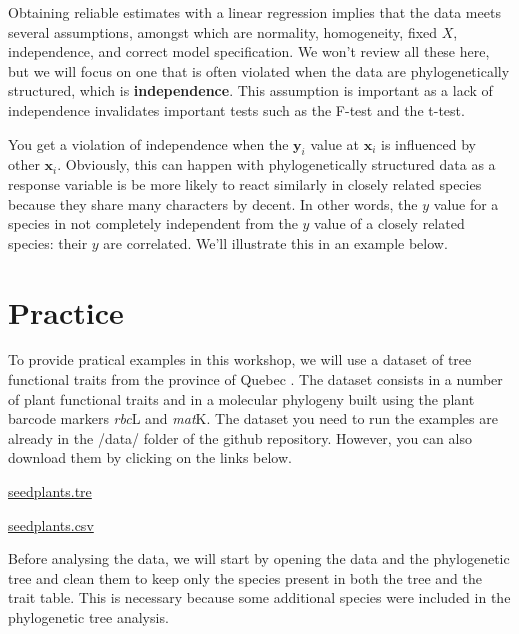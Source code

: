 \documentclass[
]{book}
\begin{document}
Obtaining reliable estimates with a linear regression implies that the data meets several assumptions, amongst which are normality, homogeneity, fixed \(X\), independence, and correct model specification. We won't review all these here, but we will focus on one that is often violated when the data are phylogenetically structured, which is \textbf{independence}. This assumption is important as a lack of independence invalidates important tests such as the F-test and the t-test.

You get a violation of independence when the \(\textbf{y}_i\) value at \(\textbf{x}_i\) is influenced by other \(\textbf{x}_i\). Obviously, this can happen with phylogenetically structured data as a response variable is be more likely to react similarly in closely related species because they share many characters by decent. In other words, the \(y\) value for a species in not completely independent from the \(y\) value of a closely related species: their \(y\) are correlated. We'll illustrate this in an example below.

\section{Practice}\label{practice}

To provide pratical examples in this workshop, we will use a dataset of tree functional traits from the province of Quebec \citep{paquette2015explaining}. The dataset consists in a number of plant functional traits and in a molecular phylogeny built using the plant barcode markers \emph{rbc}L and \emph{mat}K. The dataset you need to run the examples are already in the /data/ folder of the github repository. However, you can also download them by clicking on the links below.

\href{https://simjoly.github.io/ComparativeMethods-HalfDayWorkshop/data/seedplants.tre}{seedplants.tre}

\href{https://simjoly.github.io/ComparativeMethods-HalfDayWorkshop/data/seedplants.csv}{seedplants.csv}

Before analysing the data, we will start by opening the data and the phylogenetic tree and clean them to keep only the species present in both the tree and the trait table. This is necessary because some additional species were included in the phylogenetic tree analysis.
\end{document}
